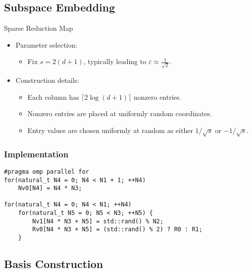 \subsection{Subspace Embedding}

\begin{frame}{Sparse Reduction Map}
    \begin{itemize}
        \item Parameter selection:
        \begin{itemize}
            \item Fix $s = 2 \left( d + 1 \right)$, typically leading to $\varepsilon \approx \frac{1}{\sqrt{2}}$.
        \end{itemize}
        \item Construction details:
        \begin{itemize}
            \item Each column has $\lceil 2 \log \left( d + 1 \right) \rceil$ nonzero entries.
            \item Nonzero entries are placed at uniformly random coordinates.
            \item Entry values are chosen uniformly at random as either $1 / \sqrt{s}$ or $-1 / \sqrt{s}$.
        \end{itemize}
    \end{itemize}
\end{frame}

\begin{frame}[fragile] %
    \frametitle{Implementation}

\begin{lstlisting}[style=cpp]
#pragma omp parallel for
for(natural_t N4 = 0; N4 < N1 + 1; ++N4)
    Nv0[N4] = N4 * N3;

for(natural_t N4 = 0; N4 < N1; ++N4)
    for(natural_t N5 = 0; N5 < N3; ++N5) {
        Nv1[N4 * N3 + N5] = std::rand() % N2;
        Rv0[N4 * N3 + N5] = (std::rand() % 2) ? R0 : R1;
    }
\end{lstlisting}

\end{frame}

\subsection{Basis Construction}


